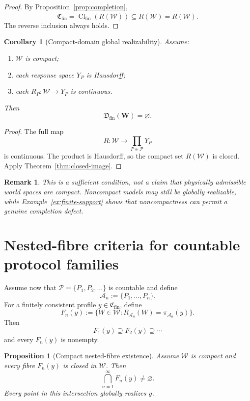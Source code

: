 \documentclass[11pt]{article}
\newtheorem{proposition}[definition]{Proposition}
\newtheorem{corollary}[definition]{Corollary}
\newtheorem{remark}[definition]{Remark}
\newcommand{\W}{\mathcal W}
\newcommand{\Pcal}{\mathcal P}
\newcommand{\Acal}{\mathcal A}
\newcommand{\Cfin}{\mathfrak C_{\mathrm{fin}}}
\newcommand{\Dfin}{\mathfrak D_{\mathrm{fin}}}
\begin{document}
\begin{proof}
By Proposition~\ref{prop:completion},
\[
\Cfin=\operatorname{Cl}_{\mathrm{fin}}(R(\W))
\subseteq
\overline{R(\W)}
=
R(\W).
\]
The reverse inclusion always holds.
\end{proof}

\begin{corollary}[Compact-domain global realizability]\label{cor:compact}
Assume:
\begin{enumerate}[label=(\roman*)]
\item $\W$ is compact;
\item each response space $Y_P$ is Hausdorff;
\item each $R_P:\W\to Y_P$ is continuous.
\end{enumerate}
Then
\[
\Dfin(\mathbf W)=\varnothing.
\]
\end{corollary}

\begin{proof}
The full map
\[
R:\W\to\prod_{P\in\Pcal}Y_P
\]
is continuous. The product is Hausdorff, so the compact set $R(\W)$ is closed.
Apply Theorem~\ref{thm:closed-image}.
\end{proof}

\begin{remark}
This is a sufficient condition, not a claim that physically admissible world
spaces are compact. Noncompact models may still be globally realizable, while
Example~\ref{ex:finite-support} shows that noncompactness can permit a genuine
completion defect.
\end{remark}

\section{Nested-fibre criteria for countable protocol families}

Assume now that $\Pcal=\{P_1,P_2,\ldots\}$ is countable and define
\[
\Acal_n:=\{P_1,\ldots,P_n\}.
\]
For a finitely consistent profile $y\in\Cfin$, define
\[
F_n(y)
:=
\{W\in\W:R_{\Acal_n}(W)=\pi_{\Acal_n}(y)\}.
\]
Then
\[
F_1(y)\supseteq F_2(y)\supseteq\cdots
\]
and every $F_n(y)$ is nonempty.

\begin{proposition}[Compact nested-fibre existence]
Assume $\W$ is compact and every fibre $F_n(y)$ is closed in $\W$. Then
\[
\bigcap_{n=1}^{\infty}F_n(y)\neq\varnothing.
\]
Every point in this intersection globally realizes $y$.
\end{proposition}
\end{document}
